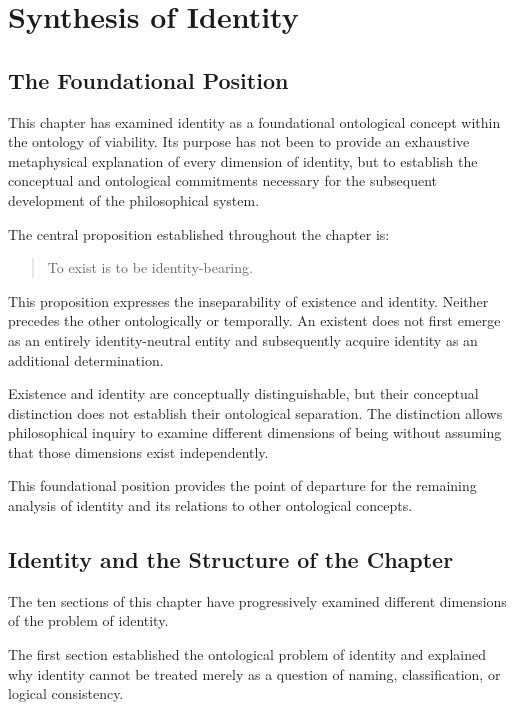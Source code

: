 
\section{Synthesis of Identity}
\label{sec:synthesis-of-identity}

\subsection{The Foundational Position}

This chapter has examined identity as a foundational ontological concept within the ontology of viability. Its purpose has not been to provide an exhaustive metaphysical explanation of every dimension of identity, but to establish the conceptual and ontological commitments necessary for the subsequent development of the philosophical system.

The central proposition established throughout the chapter is:

\begin{quote}
To exist is to be identity-bearing.
\end{quote}

This proposition expresses the inseparability of existence and identity. Neither precedes the other ontologically or temporally. An existent does not first emerge as an entirely identity-neutral entity and subsequently acquire identity as an additional determination.

Existence and identity are conceptually distinguishable, but their conceptual distinction does not establish their ontological separation. The distinction allows philosophical inquiry to examine different dimensions of being without assuming that those dimensions exist independently.

This foundational position provides the point of departure for the remaining analysis of identity and its relations to other ontological concepts.

\subsection{Identity and the Structure of the Chapter}

The ten sections of this chapter have progressively examined different dimensions of the problem of identity.

The first section established the ontological problem of identity and explained why identity cannot be treated merely as a question of naming, classification, or logical consistency.

